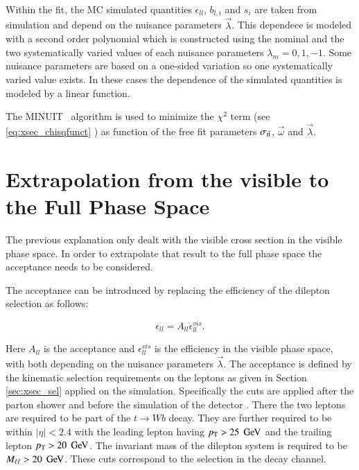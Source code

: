 Within the fit, the MC simulated quantities $\epsilon_{ll}$, $b_{l,i}$ and $s_{i}$ are taken from simulation and depend on the nuisance parameters $\vec{\lambda}$.
This dependece is modeled with a second order polynomial which is constructed using the nominal and the two systematically varied values of each nuisance parameters $\lambda_m=0,1,-1$.
Some nuisance parameters are based on a one-sided variation so one systematically varied value exists. In these cases the dependence of the simulated quantities is modeled by a linear function.

The MINUIT~\cite{James:1975dr} algorithm is used to minimize the  $\chi^2$ term (see \ref{eq:xsec_chisqfunct} ) as function of the free fit parameters $\sigma_\mathrm{t\bar{t}}$, $\vec{\omega}$
and $\vec{\lambda}$. 



\section{Extrapolation from the visible to the Full Phase Space}
\label{sec:xsec_extraction}

The previous explanation only dealt with the visible cross section in the visible phase space. In order to extrapolate that result to the full phase space the acceptance
needs to be considered.

The acceptance can be introduced by replacing the efficiency of the dilepton selection as follows:

\begin{equation}
\epsilon_{ll} = A_{ll} \epsilon^{vis}_{ll}.
\label{eq:epsacc}
\end{equation}

Here $A_{ll}$ is the acceptance and $\epsilon^{vis}_{ll}$ is the efficiency in the visible phase space, with both depending on the nuisance parameters $\vec{\lambda}$.
The acceptance is defined by the kinematic selection requirements on the leptons as given in Section \ref{sec:xsec_sel} applied on the simulation. Specifically the cuts are applied after the parton shower and before the simulation of the detector . There the two leptons are required to be part of the $t \rightarrow W b$ decay. They are further required to be within $|\eta|< 2.4$ with the 
leading lepton having $p_{\mathrm{T}} > 25 \; \,\text{Ge\hspace{-.08em}V}$ and the trailing lepton $p_{\mathrm{T}} > 20 \; \,\text{Ge\hspace{-.08em}V}$. The invariant mass of the dilepton system is required to be $M_{\ell\ell} > 20 \; \,\text{Ge\hspace{-.08em}V}$.
These cuts correspond to the selection in the \emu decay channel.

